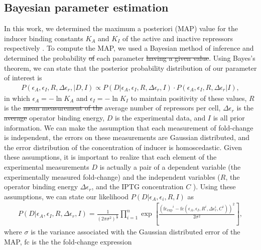 \subsection*{Bayesian parameter estimation}
In this work, we determined the maximum a posteriori (MAP) value for
the inducer binding constants $K_A$ and $K_I$ of the active and inactive
repressors respectively . To compute the MAP, we used a Bayesian method of
inference and determined the probability  \sout{of} each parameter \sout{having a given
value}. Using Bayes's theorem, we can state that the posterior probability
distribution of our parameter of interest is
\begin{align}
P(\epsilon_A, \epsilon_I, R, \Delta\epsilon_r, \vert D, I) \propto P(D \vert
\epsilon_A, \epsilon_I, R, \Delta\epsilon_r, I)\cdot P(\epsilon_A, \epsilon_I,
R, \Delta\epsilon_r \vert I),
\end{align}
in which $\epsilon_A = -\ln K_A$ and $\epsilon_I = -\ln K_I$ to maintain positivity of these values, $R$ is the \sout{mean measurement of the} average number of
repressors per cell, $\Delta\epsilon_r$ is the \sout{average} operator binding
energy, $D$ is the experimental data, and $I$ is all prior information. We can
make the assumption that each measurement of fold-change is independent, the
errors on these measurements are Gaussian distributed, and the error
distribution of the concentration of inducer is homoscedastic. Given these
assumptions, it is important to realize that each element of the experimental
measurements $D$ is actually a pair of a dependent variable (the experimentally
measured fold-change) and the independent variables ($R$, the operator binding
energy $\Delta\epsilon_r$, and the IPTG concentration $C$ ). Using these assumptions, we can state our likelihood
$P(D \vert \epsilon_A, \epsilon_i, R, I)$ as \begin{align} P(D \vert
\epsilon_A, \epsilon_I, R, \Delta\epsilon_r, I) =
\frac{1}{(2\pi\sigma^2)^{\frac{n}{2}}}\prod\limits_{i=1}^n\exp\left[\frac{(\mathrm{fc_{exp}}^i -
\mathrm{fc}(\epsilon_A, \epsilon_I, R^i, \Delta\epsilon_r^i,
C^i))^2}{2\sigma^2}\right], \end{align} where  $\sigma$ is the variance associated with the Gaussian
distributed error of the MAP, $\mathrm{fc}$ is the the fold-change expression
